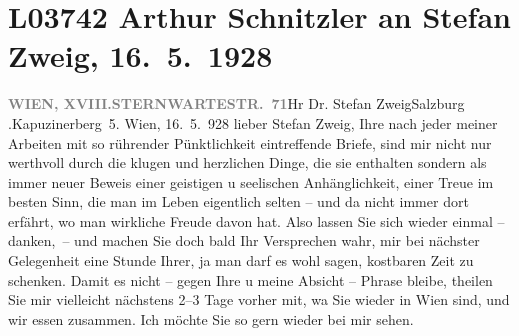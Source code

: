 

\section[Arthur Schnitzler an Stefan Zweig, 16. 5. 1928]{L03742 Arthur Schnitzler an Stefan Zweig, 16. 5. 1928}
\nopagebreak{}
\rehead{ }\normalsize\beginnumbering{}
\toendnotes[C]{\smallbreak\pagebreak[2]}
\toendnotes[C]{\smallbreak}\pstart{}{\pb}\label{T_L03742-1v}\label{T_L03742-1}\pend{}\pstart{}\textcolor{gray}{\textbf{WIEN, XVIII.}}\pend{}\pstart{}\textcolor{gray}{\textbf{STERNWARTESTR. 71}}\pend{}{\bigskip}\pstart{}Hr Dr. Stefan Zweig\pend{}\pstart{}Salzburg .\pend{}\pstart{}Kapuzinerberg 5.\pend{}{\bigskip}\vspace{1em}
\pstart
           \raggedleft{}{\pb}Wien,
                        16. 5. 928\pend
           \vspace{0.5em}
\pstart
           lieber Stefan Zweig, Ihre nach jeder meiner Arbeiten mit so
               rührender Pünktlichkeit eintreffende Briefe, sind mir nicht nur werthvoll durch die
               klugen und herzlichen Dinge, die sie enthalten sondern als immer neuer Beweis einer
               geistigen u seelischen Anhänglichkeit, einer Treue im besten Sinn, die man im Leben
               eigentlich selten – und da{\geminationn} nicht immer dort erfährt, wo man wirkliche Freude davon
               hat. Also lassen Sie sich wieder einmal – danken, – und machen Sie doch bald Ihr
               Versprechen wahr, mir bei nächster Gelegenheit eine Stunde Ihrer, ja man darf es wohl
               sagen, kostbaren Zeit zu schenken. {\pb}Damit es nicht – gegen
               Ihre u meine Absicht – Phrase bleibe, theilen Sie
               mir vielleicht nächstens 2–3 Tage vorher mit, wa{\geminationn} Sie wieder in Wien sind, und wir essen zusammen. Ich möchte Sie so gern wieder
               bei mir sehen.\pend
           
